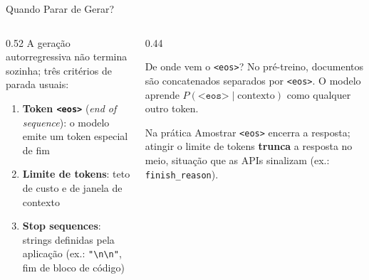 \documentclass[aspectratio=169, xcolor=dvipsnames]{beamer}
\begin{document}
  \begin{frame}{Quando Parar de Gerar?}
    \begin{columns}[T]
      \begin{column}{0.52\textwidth}
        A geração autorregressiva não termina sozinha; três critérios de parada usuais:
        \begin{enumerate}
          \item \textbf{Token \texttt{<eos>}} (\textit{end of sequence}): o modelo emite um token especial de fim
          \item \textbf{Limite de tokens}: teto de custo e de janela de contexto
          \item \textbf{Stop sequences}: strings definidas pela aplicação (ex.: \texttt{"\textbackslash n\textbackslash n"}, fim de bloco de código)
        \end{enumerate}
      \end{column}
      \begin{column}{0.44\textwidth}
        \begin{block}{De onde vem o \texttt{<eos>}?}
          No pré-treino, documentos são concatenados separados por \texttt{<eos>}. O modelo aprende $P(\texttt{<eos>} \mid \text{contexto})$ como qualquer outro token.
        \end{block}
        \vspace{0.3em}
        \begin{exampleblock}{Na prática}
          Amostrar \texttt{<eos>} encerra a resposta; atingir o limite de tokens \textbf{trunca} a resposta no meio, situação que as APIs sinalizam (ex.: \texttt{finish\_reason}).
        \end{exampleblock}
      \end{column}
    \end{columns}
  \end{frame}
\end{document}
